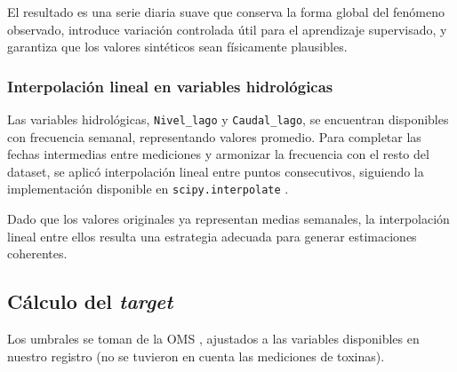 \documentclass[11pt]{report}
\begin{document}
El resultado es una serie diaria suave que conserva la forma global del fenómeno observado, introduce variación controlada útil para el aprendizaje supervisado, y garantiza que los valores sintéticos sean físicamente plausibles.


\subsubsection{Interpolación lineal en variables hidrológicas}

Las variables hidrológicas, \texttt{Nivel\_lago} y \texttt{Caudal\_lago}, se encuentran disponibles con frecuencia semanal, representando valores promedio. Para completar las fechas intermedias entre mediciones y armonizar la frecuencia con el resto del dataset, se aplicó interpolación lineal entre puntos consecutivos, siguiendo la implementación disponible en \texttt{scipy.interpolate} \citep{virtanen2020scipy}.

Dado que los valores originales ya representan medias semanales, la interpolación lineal entre ellos resulta una estrategia adecuada para generar estimaciones coherentes.


\subsection{Cálculo del \textit{target}}
Los umbrales se toman de la OMS \citep{WHO2021}, ajustados a las
variables disponibles en nuestro registro (no se tuvieron en cuenta las mediciones de toxinas).
\end{document}
